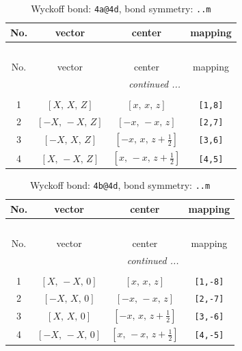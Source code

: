\documentclass[fleqn,8pt]{jsarticle}
\begin{document}
\begin{longtable}{cccc}
\caption{Wyckoff bond: {\tt 4a@4d}, bond symmetry: {\tt ..m}}
 \\
 \hline \hline
No. & vector & center & mapping \\ \hline \endfirsthead

\multicolumn{3}{l}{\tablename\ \thetable{}} \\
 \hline \hline
No. & vector & center & mapping \\ \hline \endhead

 \hline \hline
\multicolumn{3}{r}{\footnotesize\it continued ...} \\ \endfoot

 \hline \hline
\multicolumn{3}{r}{} \\ \endlastfoot

1 & $\left[ X,\, X,\, Z \right]$ & $\left[ x,\, x,\, z \right]$ & {\tt [1,8]} \\ \hline
2 & $\left[ - X,\, - X,\, Z \right]$ & $\left[ - x,\, - x,\, z \right]$ & {\tt [2,7]} \\ \hline
3 & $\left[ - X,\, X,\, Z \right]$ & $\left[ - x,\, x,\, z + \frac{1}{2} \right]$ & {\tt [3,6]} \\ \hline
4 & $\left[ X,\, - X,\, Z \right]$ & $\left[ x,\, - x,\, z + \frac{1}{2} \right]$ & {\tt [4,5]} \\
\end{longtable}
\renewcommand{\arraystretch}{1.2}
\begin{longtable}{cccc}
\caption{Wyckoff bond: {\tt 4b@4d}, bond symmetry: {\tt ..m}}
 \\
 \hline \hline
No. & vector & center & mapping \\ \hline \endfirsthead

\multicolumn{3}{l}{\tablename\ \thetable{}} \\
 \hline \hline
No. & vector & center & mapping \\ \hline \endhead

 \hline \hline
\multicolumn{3}{r}{\footnotesize\it continued ...} \\ \endfoot

 \hline \hline
\multicolumn{3}{r}{} \\ \endlastfoot

1 & $\left[ X,\, - X,\, 0 \right]$ & $\left[ x,\, x,\, z \right]$ & {\tt [1,-8]} \\ \hline
2 & $\left[ - X,\, X,\, 0 \right]$ & $\left[ - x,\, - x,\, z \right]$ & {\tt [2,-7]} \\ \hline
3 & $\left[ X,\, X,\, 0 \right]$ & $\left[ - x,\, x,\, z + \frac{1}{2} \right]$ & {\tt [3,-6]} \\ \hline
4 & $\left[ - X,\, - X,\, 0 \right]$ & $\left[ x,\, - x,\, z + \frac{1}{2} \right]$ & {\tt [4,-5]} \\
\end{longtable}
\end{document}
